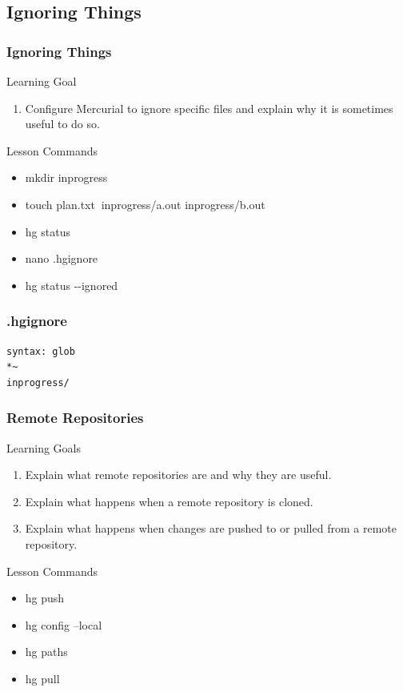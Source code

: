\documentclass{beamer}
\renewcommand{\dh}{{-}{-}}
\begin{document}
\subsection*{Ignoring Things}
\begin{frame}[label=ignore]
\frametitle{Ignoring Things}
\begin{block}{Learning Goal}
\begin{enumerate}
\item Configure Mercurial to ignore specific files and explain why it is sometimes useful to do so.
\end{enumerate}
\end{block}
\begin{block}{Lesson Commands}
\begin{itemize}
\item mkdir inprogress
\item touch plan.txt$~$ inprogress/a.out inprogress/b.out
\item hg status
\item nano .hgignore
\item hg status \dh ignored
\end{itemize}
\end{block}
\end{frame}

\begin{frame}[fragile]
\frametitle{.hgignore}
\begin{verbatim}
syntax: glob
*~
inprogress/
\end{verbatim}
\end{frame}



\begin{frame}[label=remote-repos]
  \frametitle{Remote Repositories}
  \begin{block}{Learning Goals}
    \begin{enumerate}
      \item Explain what remote repositories are and why they are useful.
      \item Explain what happens when a remote repository is cloned.
      \item Explain what happens when changes are pushed to or pulled from a remote repository.
    \end{enumerate}
  \end{block}
  \begin{block}{Lesson Commands}
    \begin{itemize}
      \item hg push
      \item hg config --local
      \item hg paths
      \item hg pull
    \end{itemize}
  \end{block}
\end{frame}
\end{document}

